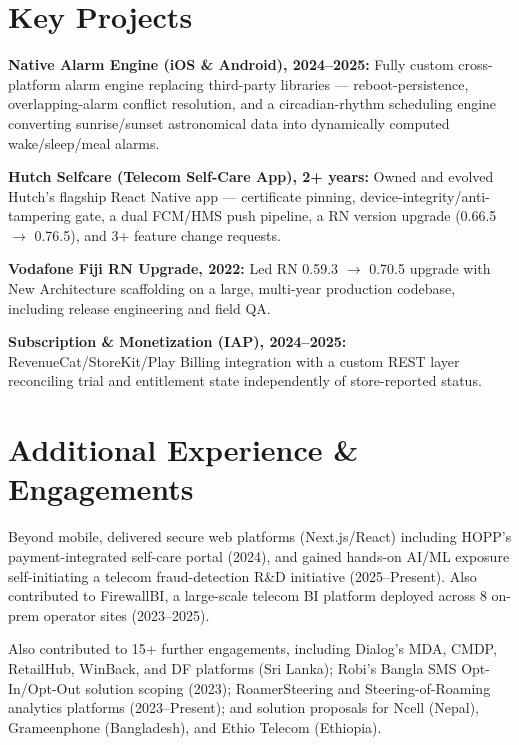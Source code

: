 \documentclass[10.5pt]{article}
\begin{document}
\section*{Key Projects}
\begin{cvitems}
  \item \textbf{Native Alarm Engine (iOS \& Android), 2024--2025:} Fully custom cross-platform alarm engine replacing third-party libraries --- reboot-persistence, overlapping-alarm conflict resolution, and a circadian-rhythm scheduling engine converting sunrise/sunset astronomical data into dynamically computed wake/sleep/meal alarms.
  \item \textbf{Hutch Selfcare (Telecom Self-Care App), 2+ years:} Owned and evolved Hutch's flagship React Native app --- certificate pinning, device-integrity/anti-tampering gate, a dual FCM/HMS push pipeline, a RN version upgrade (0.66.5 $\rightarrow$ 0.76.5), and 3+ feature change requests.
  \item \textbf{Vodafone Fiji RN Upgrade, 2022:} Led RN 0.59.3 $\rightarrow$ 0.70.5 upgrade with New Architecture scaffolding on a large, multi-year production codebase, including release engineering and field QA.
  \item \textbf{Subscription \& Monetization (IAP), 2024--2025:} RevenueCat/StoreKit/Play Billing integration with a custom REST layer reconciling trial and entitlement state independently of store-reported status.
\end{cvitems}

\section*{Additional Experience \& Engagements}
Beyond mobile, delivered secure web platforms (Next.js/React) including HOPP's payment-integrated self-care portal (2024), and gained hands-on AI/ML exposure self-initiating a telecom fraud-detection R\&D initiative (2025--Present). Also contributed to FirewallBI, a large-scale telecom BI platform deployed across 8 on-prem operator sites (2023--2025).

Also contributed to 15+ further engagements, including Dialog's MDA, CMDP, RetailHub, WinBack, and DF platforms (Sri Lanka); Robi's Bangla SMS Opt-In/Opt-Out solution scoping (2023); RoamerSteering and Steering-of-Roaming analytics platforms (2023--Present); and solution proposals for Ncell (Nepal), Grameenphone (Bangladesh), and Ethio Telecom (Ethiopia).
\end{document}
